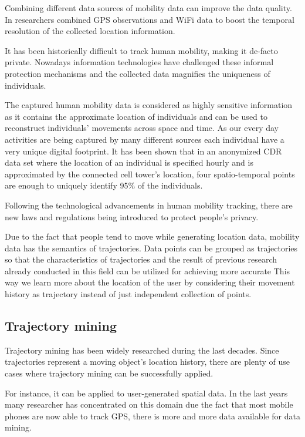 Combining different data sources of mobility data can improve the data quality. In \cite{wifi-gps} researchers combined GPS observations and WiFi data to boost the temporal resolution of the collected location information.

It has been historically difficult to track human mobility, making it de-facto private. Nowadays information technologies have challenged these informal protection mechanisms and the collected data magnifies the uniqueness of individuals. 

The captured human mobility data is considered as highly sensitive information as it contains the approximate location of individuals and can be used to reconstruct individuals' movements across space and time. As our every day activities are being captured by many different sources each individual have a very unique digital footprint. It has been shown that in an anonymized CDR data set where the location of an individual is specified hourly and is approximated by the connected cell tower's location, four spatio-temporal points are enough to uniquely identify 95\% of the individuals. \cite{privacy-mobility}

Following the technological advancements in human mobility tracking, there are new laws and regulations being introduced to protect people's privacy.

Due to the fact that people tend to move while generating location data, mobility data has the semantics of trajectories. Data points can be grouped as trajectories so that the characteristics of trajectories and the result of previous research already conducted in this field can be utilized for achieving more accurate This way we learn more about the location of the user by considering their movement history as trajectory instead of just independent collection of points. 

\subsection{Trajectory mining}
Trajectory mining has been widely researched during the last decades. Since trajectories represent a moving object's location history, there are plenty of use cases where trajectory mining can be successfully applied.

For instance, it can be applied to user-generated spatial data. In the last years many researcher has concentrated on this domain due the fact that most mobile phones are now able to track GPS, there is more and more data available for data mining. 

